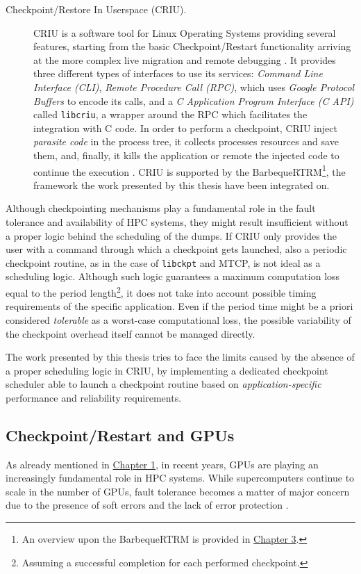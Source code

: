 \begin{description}
    \item[Checkpoint/Restore In Userspace (CRIU).] CRIU \cite{criu} is a software tool for Linux Operating Systems providing several features, starting from the basic Checkpoint/Restart functionality arriving at the more complex live migration and remote debugging \cite{reghenzani_2016}. It provides three different types of interfaces to use its services: \emph{Command Line Interface (CLI)}, \emph{Remote Procedure Call (RPC)}, which uses \emph{Google Protocol Buffers} to encode its calls, and a \emph{C Application Program Interface (C API)} called \verb|libcriu|, a wrapper around the RPC which facilitates the integration with C code. In order to perform a checkpoint, CRIU inject \emph{parasite code} in the process tree, it collects processes resources and save them, and, finally, it kills the application or remote the injected code to continue the execution \cite{reghenzani_2016}. CRIU is supported by the BarbequeRTRM\footnote{An overview upon the BarbequeRTRM is provided in {\hyperref[cap:implementation]{Chapter 3}}.}, the framework the work presented by this thesis have been integrated on.
\end{description}

Although checkpointing mechanisms play a fundamental role in the fault tolerance and availability of HPC systems, they might result insufficient without a proper logic behind the scheduling of the dumps. If CRIU only provides the user with a command through which a checkpoint gets launched, also a periodic checkpoint routine, as in the case of \verb|libckpt| and MTCP, is not ideal as a scheduling logic. Although such logic guarantees a maximum computation loss equal to the period length\footnote{Assuming a successful completion for each performed checkpoint.}, it does not take into account possible timing requirements of the specific application. Even if the period time might be a priori considered \emph{tolerable} as a worst-case computational loss, the possible variability of the checkpoint overhead itself cannot be managed directly. 

The work presented by this thesis tries to face the limits caused by the absence of a proper scheduling logic in CRIU, by implementing a dedicated checkpoint scheduler able to launch a checkpoint routine based on \emph{application-specific} performance and reliability requirements.

\subsection{Checkpoint/Restart and GPUs}
As already mentioned in {\hyperref[cap:introduction]{Chapter 1}}, in recent years, GPUs are playing an increasingly fundamental role in HPC systems. While supercomputers continue to scale in the number of GPUs, fault tolerance becomes a matter of major concern due to the presence of soft errors and the lack of error protection \cite{7056044}.


